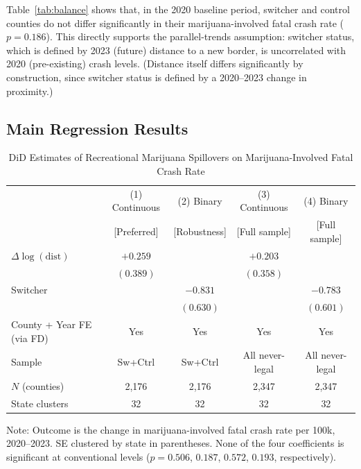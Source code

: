 \documentclass[11pt]{article}
\begin{document}
Table~\ref{tab:balance} shows that, in the 2020 baseline period,
switcher and control counties do not differ significantly in their
marijuana-involved fatal crash rate ($p=0.186$). This directly
supports the parallel-trends assumption: switcher status, which is
defined by 2023 (future) distance to a new border, is uncorrelated
with 2020 (pre-existing) crash levels. (Distance itself differs
significantly by construction, since switcher status is defined by
a 2020--2023 change in proximity.)

\subsection{Main Regression Results}

\begin{table}[htbp]
\centering
\caption{DiD Estimates of Recreational Marijuana Spillovers on Marijuana-Involved Fatal Crash Rate}
\label{tab:main}
\begin{tabular}{@{}lcccc@{}}
\toprule
 & (1) Continuous & (2) Binary & (3) Continuous & (4) Binary \\
 & [Preferred] & [Robustness] & [Full sample] & [Full sample] \\
\midrule
$\Delta\log(\mathrm{dist})$ & $+0.259$   &            & $+0.203$   &            \\
                            & $(0.389)$  &            & $(0.358)$  &            \\
Switcher                    &            & $-0.831$   &            & $-0.783$   \\
                            &            & $(0.630)$  &            & $(0.601)$  \\
County + Year FE (via FD)   & Yes        & Yes        & Yes        & Yes        \\
Sample                      & Sw+Ctrl    & Sw+Ctrl    & All never-legal & All never-legal \\
$N$ (counties)              & 2{,}176    & 2{,}176    & 2{,}347    & 2{,}347    \\
State clusters              & 32         & 32         & 32         & 32         \\
\bottomrule
\end{tabular}
\vspace{2pt}
\begin{minipage}{0.95\textwidth}
\footnotesize Note: Outcome is the change in marijuana-involved fatal
crash rate per 100k, 2020--2023. SE clustered by state in parentheses.
None of the four coefficients is significant at conventional levels
($p=0.506$, $0.187$, $0.572$, $0.193$, respectively).
\end{minipage}
\end{table}
\end{document}
